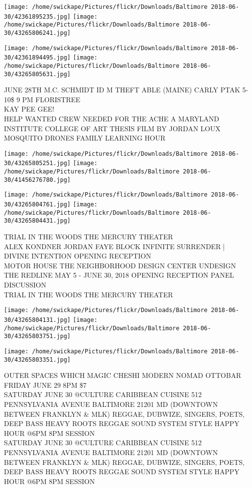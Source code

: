 \documentclass[10pt,letterpaper]{article}
\begin{document}
\texttt{[image: /home/swickape/Pictures/flickr/Downloads/Baltimore 2018-06-30/42361895235.jpg]}
\texttt{[image: /home/swickape/Pictures/flickr/Downloads/Baltimore 2018-06-30/43265806241.jpg]}

\texttt{[image: /home/swickape/Pictures/flickr/Downloads/Baltimore 2018-06-30/42361894495.jpg]}
\texttt{[image: /home/swickape/Pictures/flickr/Downloads/Baltimore 2018-06-30/43265805631.jpg]}

JUNE 28TH M.C. SCHMIDT ID M THEFT ABLE (MAINE) CARLY PTAK 5{-}10\$ 9 PM FLORISTREE\\
KAY PEE GEE!\\
HELP WANTED CREW NEEDED FOR THE ACHE A MARYLAND INSTITUTE COLLEGE OF ART THESIS FILM BY JORDAN LOUX\\
MOSQUITO DRONES FAMILY LEARNING HOUR
\pagebreak

\texttt{[image: /home/swickape/Pictures/flickr/Downloads/Baltimore 2018-06-30/43265805251.jpg]}
\texttt{[image: /home/swickape/Pictures/flickr/Downloads/Baltimore 2018-06-30/41456276780.jpg]}

\texttt{[image: /home/swickape/Pictures/flickr/Downloads/Baltimore 2018-06-30/43265804761.jpg]}
\texttt{[image: /home/swickape/Pictures/flickr/Downloads/Baltimore 2018-06-30/43265804431.jpg]}

TRIAL IN THE WOODS THE MERCURY THEATER\\
ALEX KONDNER JORDAN FAYE BLOCK INFINITE SURRENDER | DIVINE INTENTION OPENING RECEPTION\\
MOTOR HOUSE THE NEIGHBORHOOD DESIGN CENTER UNDESIGN THE REDLINE MAY 5 {-} JUNE 30, 2018 OPENING RECEPTION PANEL DISCUSSION\\
TRIAL IN THE WOODS THE MERCURY THEATER
\pagebreak

\texttt{[image: /home/swickape/Pictures/flickr/Downloads/Baltimore 2018-06-30/43265804131.jpg]}
\texttt{[image: /home/swickape/Pictures/flickr/Downloads/Baltimore 2018-06-30/43265803751.jpg]}

\texttt{[image: /home/swickape/Pictures/flickr/Downloads/Baltimore 2018-06-30/43265803351.jpg]}

OUTER SPACES WHICH MAGIC CHESHI MODERN NOMAD OTTOBAR FRIDAY JUNE 29 8PM \$7\\
SATURDAY JUNE 30 @CULTURE CARIBBEAN CUISINE 512 PENNSYLVANIA AVENUE BALTIMORE 21201 MD (DOWNTOWN BETWEEN FRANKLYN \& MLK) REGGAE, DUBWIZE, SINGERS, POETS, DEEP BASS HEAVY ROOTS REGGAE SOUND SYSTEM STYLE HAPPY HOUR @6PM 8PM SESSION\\
SATURDAY JUNE 30 @CULTURE CARIBBEAN CUISINE 512 PENNSYLVANIA AVENUE BALTIMORE 21201 MD (DOWNTOWN BETWEEN FRANKLYN \& MLK) REGGAE, DUBWIZE, SINGERS, POETS, DEEP BASS HEAVY ROOTS REGGAE SOUND SYSTEM STYLE HAPPY HOUR @6PM 8PM SESSION
\pagebreak
\end{document}
